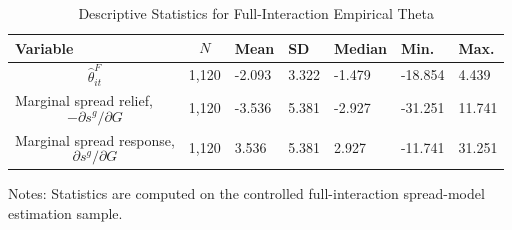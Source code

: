 \begin{table}[H]\centering
\begin{threeparttable}
\caption{Descriptive Statistics for Full-Interaction Empirical Theta}
\label{tab:theta_descriptive_stats}
\scriptsize
\begin{tabularx}{\textwidth}{lYYYYYY}
\toprule
Variable & $$N$$ & Mean & SD & Median & Min. & Max. \\
\midrule
$$\widehat{\theta}^{F}_{it}$$ & 1,120 & -2.093 & 3.322 & -1.479 & -18.854 & 4.439 \\
Marginal spread relief, $$-\partial s^g/\partial G$$ & 1,120 & -3.536 & 5.381 & -2.927 & -31.251 & 11.741 \\
Marginal spread response, $$\partial s^g/\partial G$$ & 1,120 & 3.536 & 5.381 & 2.927 & -11.741 & 31.251 \\
\bottomrule
\end{tabularx}
\begin{tablenotes}[flushleft]\footnotesize
\item Notes: Statistics are computed on the controlled full-interaction spread-model estimation sample.
\end{tablenotes}
\end{threeparttable}
\end{table}
